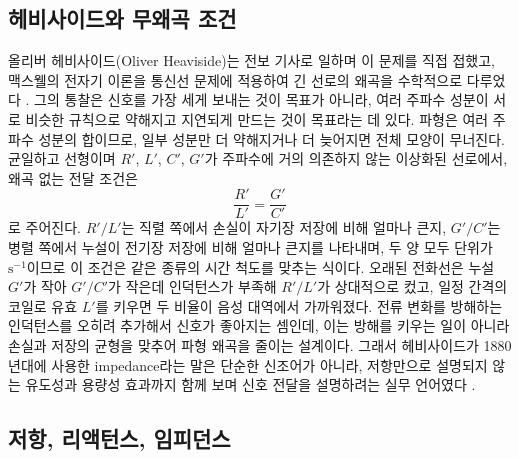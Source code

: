 \subsection{헤비사이드와 무왜곡 조건}

올리버 헤비사이드(Oliver Heaviside)는 전보 기사로 일하며 이 문제를 직접
접했고, 맥스웰의 전자기 이론을 통신선 문제에 적용하여 긴 선로의 왜곡을
수학적으로 다루었다 \cite{heaviside_electrical_papers,donaghyspargo2018heaviside}.
그의 통찰은 신호를 가장 세게 보내는 것이 목표가 아니라, 여러 주파수 성분이
서로 비슷한 규칙으로 약해지고 지연되게 만드는 것이 목표라는 데 있다.
파형은 여러 주파수 성분의 합이므로, 일부 성분만 더 약해지거나 더 늦어지면
전체 모양이 무너진다.
균일하고 선형이며 $R'$, $L'$, $C'$, $G'$가 주파수에 거의 의존하지 않는
이상화된 선로에서, 왜곡 없는 전달 조건은
\begin{equation}
  \frac{R'}{L'} = \frac{G'}{C'}
\end{equation}
로 주어진다.
$R'/L'$는 직렬 쪽에서 손실이 자기장 저장에 비해 얼마나 큰지,
$G'/C'$는 병렬 쪽에서 누설이 전기장 저장에 비해 얼마나 큰지를 나타내며,
두 양 모두 단위가 $\mathrm{s}^{-1}$이므로 이 조건은 같은 종류의 시간 척도를
맞추는 식이다.
오래된 전화선은 누설 $G'$가 작아 $G'/C'$가 작은데 인덕턴스가 부족해
$R'/L'$가 상대적으로 컸고, 일정 간격의 코일로 유효 $L'$를 키우면 두 비율이
음성 대역에서 가까워졌다.
전류 변화를 방해하는 인덕턴스를 오히려 추가해서 신호가 좋아지는 셈인데,
이는 방해를 키우는 일이 아니라 손실과 저장의 균형을 맞추어 파형 왜곡을
줄이는 설계이다.
그래서 헤비사이드가 1880년대에 사용한 impedance라는 말은 단순한 신조어가
아니라, 저항만으로 설명되지 않는 유도성과 용량성 효과까지 함께 보며 신호
전달을 설명하려는 실무 언어였다 \cite{ethw_heaviside,ptb_impedance_history}.

\subsection{저항, 리액턴스, 임피던스}

